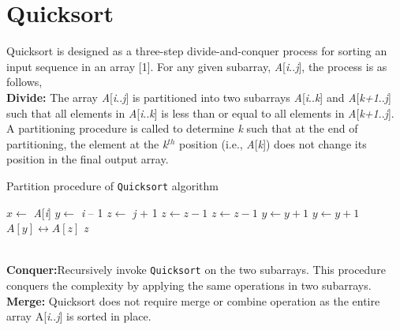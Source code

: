 \documentclass[a4paper, 10pt,twocolumn]{article}
\begin{document}
\section{Quicksort}
Quicksort is designed as a three-step divide-and-conquer process for sorting an input sequence in an array [1]. For any given subarray, \textit{A}[\textit{i}..\textit{j}], the process is as follows, \\
\textbf{Divide:} The array \textit{A}[\textit{i}..\textit{j}] is partitioned into two subarrays \textit{A}[\textit{i}..\textit{k}] and \textit{A}[\textit{k+1}..\textit{j}] such that all elements in \textit{A}[\textit{i}..\textit{k}] is less than or equal to all elements in \textit{A}[\textit{k+1}..\textit{j}]. A partitioning procedure is called to determine \textit{k} such that at the end of partitioning, the element at the \textit{k}$^{th}$ position (i.e., \textit{A}[\textit{k}]) does not change its position in the final output array. 
\begin{algorithm}
  \caption{ Partition procedure of \texttt{Quicksort} algorithm}
  \label{algo:quick_sort1}
  \begin{algorithmic}[1]
     \newline
      \newline
      \State $x \leftarrow$ \textit{A}[\textit{i}]
      \State $y \leftarrow$ \textit{i} -- 1
      \State $z \leftarrow$ \textit{j} + 1
          \State $z \leftarrow z - 1$ 
            \State $z \leftarrow z -1$ 
         \EndWhile
         \State $y \leftarrow y + 1$ 
            \State $y \leftarrow y + 1$ 
         \EndWhile
             $A[y] \leftrightarrow A[z]$
         \Else 
             \textit{z}
         \EndIf
      \EndWhile
     \EndProcedure 
  \end{algorithmic}
\end{algorithm}\\
\textbf{Conquer:}Recursively invoke \texttt{Quicksort} on the two subarrays. This procedure conquers the complexity by applying the same operations in two subarrays.\\
\textbf{Merge:} Quicksort does not require merge or combine operation as the entire array A[\textit{i}..\textit{j}] is sorted
in place.
\end{document}
